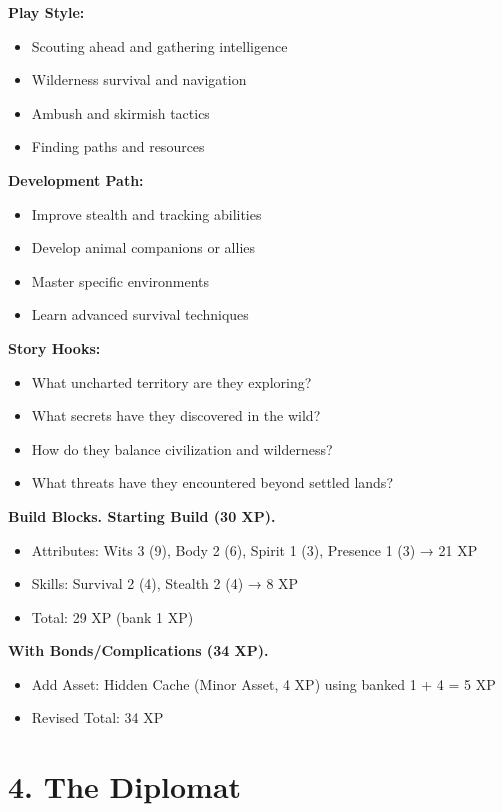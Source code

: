 \documentclass[11pt,twoside,openany]{book}
\begin{document}
\textbf{Play Style:}
\begin{itemize}
\item Scouting ahead and gathering intelligence
\item Wilderness survival and navigation
\item Ambush and skirmish tactics
\item Finding paths and resources
\end{itemize}

\textbf{Development Path:}
\begin{itemize}
\item Improve stealth and tracking abilities
\item Develop animal companions or allies
\item Master specific environments
\item Learn advanced survival techniques
\end{itemize}

\textbf{Story Hooks:}
\begin{itemize}
\item What uncharted territory are they exploring?
\item What secrets have they discovered in the wild?
\item How do they balance civilization and wilderness?
\item What threats have they encountered beyond settled lands?
\end{itemize}

\textbf{Build Blocks. Starting Build (30 XP).}
\begin{itemize}
\item Attributes: Wits 3 (9), Body 2 (6), Spirit 1 (3), Presence 1 (3) → 21 XP
\item Skills: Survival 2 (4), Stealth 2 (4) → 8 XP
\item Total: 29 XP (bank 1 XP)
\end{itemize}

\textbf{With Bonds/Complications (34 XP).}
\begin{itemize}
\item Add Asset: Hidden Cache (Minor Asset, 4 XP) using banked 1 + 4 = 5 XP
\item Revised Total: 34 XP
\end{itemize}

\section*{4. The Diplomat} 
\end{document}
